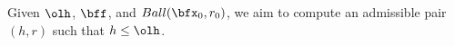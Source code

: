 {%
%	
%
%
%
%			
	Given $\olh$, $\bff$, and $Ball(\bfx_0, r_0)$,
	we aim to compute an admissible pair $(h, r)$
	such that $h \le \olh$.
}
